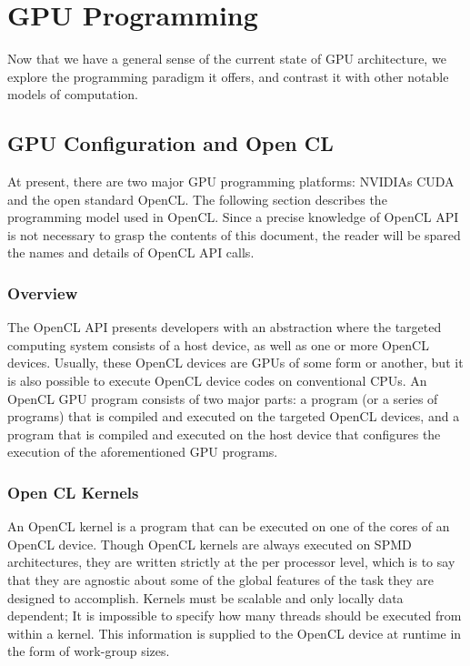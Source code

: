 \documentclass[12pt,twoside]{reedthesis}
\begin{document}
\chapter{GPU Programming}

Now that we have a general sense of the current state of GPU architecture, we explore the programming paradigm it offers, and contrast it with other notable models of computation.

\section{GPU Configuration and Open CL}

At present, there are two major GPU programming platforms: NVIDIAs CUDA and the open standard OpenCL. The following section describes the programming model used in OpenCL. Since a precise knowledge of OpenCL API is not necessary to grasp the contents of this document, the reader will be spared the names and details of OpenCL API calls.

\subsection{Overview}

The OpenCL API presents developers with an abstraction where the targeted computing system consists of a host device, as well as one or more OpenCL devices. Usually, these OpenCL devices are GPUs of some form or another, but it is also possible to execute OpenCL device codes on conventional CPUs. An OpenCL GPU program consists of two major parts: a program (or a series of programs) that is compiled and executed on the targeted OpenCL devices, and a program that is compiled and executed on the host device that configures the execution of the aforementioned GPU programs.

\subsection{Open CL Kernels}
\label{Kernels}

An OpenCL kernel is a program that can be executed on one of the cores of an OpenCL device. Though OpenCL kernels are always executed on SPMD architectures, they are written strictly at the per processor level, which is to say that they are agnostic about some of the global features of the task they are designed to accomplish. Kernels must be scalable and only locally data dependent; It is impossible to specify how many threads should be executed from within a kernel. This information is supplied to the OpenCL device at runtime in the form of work-group sizes. 
\end{document}
